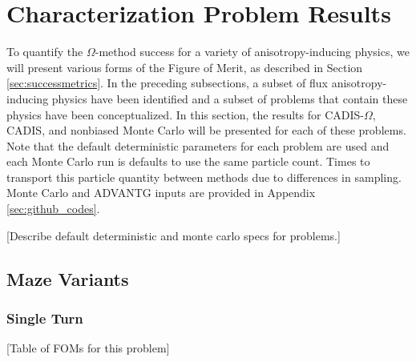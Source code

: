 \section{Characterization Problem Results}
\label{sec:CharResults}

To quantify the $\Omega$-method success for a variety of anisotropy-inducing
physics, we will present various forms of the Figure of Merit, as described in
Section \ref{sec:successmetrics}.
In the preceding subsections, a
subset of flux anisotropy-inducing physics have been identified
and a subset of problems that contain these physics have been conceptualized.
In this section, the results for CADIS-$\Omega$, CADIS, and nonbiased Monte Carlo
will be presented for each of these problems. Note that the default
deterministic parameters for each problem are used and each Monte Carlo run is
defaults to use the same particle count. Times to transport this particle
quantity between methods due to differences in sampling. Monte Carlo and ADVANTG
inputs are provided in Appendix \ref{sec:github_codes}.

\begin{table}[h!]
  \centering
  
  \caption[Default simulation values for characterization problems.]{
    Default simulation values for the characterization problems. The values for
    ADVANTG primarily signify parameters used to run Denovo, with exceptions for
    calculating biasing parameters, which is done exclusively in ADVANTG.
    MCNP-specific values are those used for Monte Carlo runs.
  }
  \label{tab:simulation_defaults}
\end{table}
[Describe default deterministic and monte carlo specs for problems.]

\subsection{Maze Variants}
\label{subsec:resultsmaze}
\subsubsection{Single Turn}
[Table of FOMs for this problem] \\

\begin{table}[h!]
  \centering
  
  \caption[Figure of Merit comparison for single turn maze.]{The FOMS are
  quantified using three relative error results and two different timing results.
  The relative errors used are the tally average relative error, the tally maximum relative
  error, and the tally minimum relative error; the times are total walltimes for
  the Monte Carlo calculation and the sum of the hybrid method software, the
  deterministic tranport time, and the Monte Carlo calculation time.}
  \label{tab:maze1foms}
\end{table}

